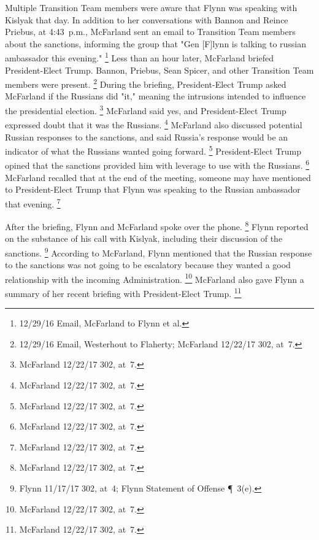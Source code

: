 Multiple Transition Team members were aware that Flynn was speaking with Kislyak that day.
In addition to her conversations with Bannon and Reince Priebus, at 4:43~p.m., McFarland sent an email to Transition Team members about the sanctions, informing the group that "Gen [F]lynn is talking to russian ambassador this evening."%
\footnote{12/29/16 Email, McFarland to Flynn et al.}
Less than an hour later, McFarland briefed President-Elect Trump.
Bannon, Priebus, Sean Spicer, and other Transition Team members were present.%
\footnote{12/29/16 Email, Westerhout to Flaherty;
McFarland 12/22/17 302, at~7.}
During the briefing, President-Elect Trump asked McFarland if the Russians did "it," meaning the intrusions intended to influence the presidential election.%
\footnote{McFarland 12/22/17 302, at~7.}
McFarland said yes, and President-Elect Trump expressed doubt that it was the Russians.%
\footnote{McFarland 12/22/17 302, at~7.}
McFarland also discussed potential Russian responses to the sanctions, and said Russia's response would be an indicator of what the Russians wanted going forward.%
\footnote{McFarland 12/22/17 302, at~7.}
President-Elect Trump opined that the sanctions provided him with leverage to use with the Russians.%
\footnote{McFarland 12/22/17 302, at~7.}
McFarland recalled that at the end of the meeting, someone may have mentioned to President-Elect Trump that Flynn was speaking to the Russian ambassador that evening.%
\footnote{McFarland 12/22/17 302, at~7.}

After the briefing, Flynn and McFarland spoke over the phone.%
\footnote{McFarland 12/22/17 302, at~7.}
Flynn reported on the substance of his call with Kislyak, including their discussion of the sanctions.%
\footnote{Flynn 11/17/17 302, at~4;
Flynn Statement of Offense \P~3(e).}
According to McFarland, Flynn mentioned that the Russian response to the sanctions was not going to be escalatory because they wanted a good relationship with the incoming Administration.%
\footnote{McFarland 12/22/17 302, at~7.}
McFarland also gave Flynn a summary of her recent briefing with President-Elect Trump.%
\footnote{McFarland 12/22/17 302, at~7.}


